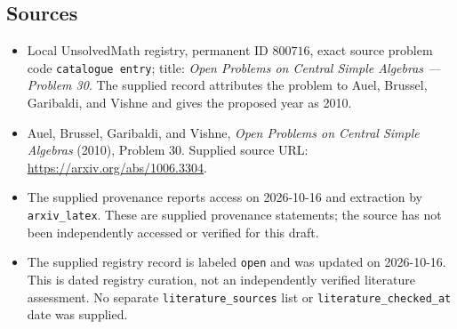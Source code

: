 \documentclass[11pt]{article}
\begin{document}
\subsection{Sources}
\begin{itemize}
\item Local UnsolvedMath registry, permanent ID \(800716\), exact source problem code \texttt{catalogue entry}; title: \emph{Open Problems on Central Simple Algebras --- Problem 30}. The supplied record attributes the problem to Auel, Brussel, Garibaldi, and Vishne and gives the proposed year as 2010.
\item Auel, Brussel, Garibaldi, and Vishne, \emph{Open Problems on Central Simple Algebras} (2010), Problem 30. Supplied source URL: \url{https://arxiv.org/abs/1006.3304}.
\item The supplied provenance reports access on 2026-10-16 and extraction by \texttt{arxiv\_latex}. These are supplied provenance statements; the source has not been independently accessed or verified for this draft.
\item The supplied registry record is labeled \texttt{open} and was updated on 2026-10-16. This is dated registry curation, not an independently verified literature assessment. No separate \texttt{literature\_sources} list or \texttt{literature\_checked\_at} date was supplied.
\end{itemize}
\end{document}
